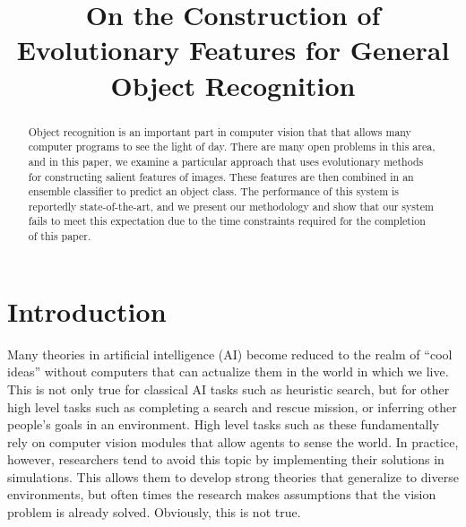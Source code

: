 \documentclass[conference]{IEEEtran}
\begin{document}
\author{
}

\title{On the Construction of Evolutionary Features for General Object Recognition}
\maketitle

\begin{abstract}
  Object recognition is an important part in computer vision that that allows many computer programs to see the light of day. There are many open problems in this area, and in this paper, we examine a particular approach that uses evolutionary methods for constructing salient features of images. These features are then combined in an ensemble classifier to predict an object class. The performance of this system is reportedly state-of-the-art, and we present our methodology and show that our system fails to meet this expectation due to the time constraints required for the completion of this paper.
\end{abstract}

\IEEEpeerreviewmaketitle

\section{Introduction}
Many theories in artificial intelligence (AI) become reduced to the realm of ``cool ideas'' without computers that can actualize them in the world in which we live. This is not only true for classical AI tasks such as heuristic search, but for other high level tasks such as completing a search and rescue mission, or inferring other people's goals in an environment. High level tasks such as these fundamentally rely on computer vision modules that allow agents to sense the world. In practice, however, researchers tend to avoid this topic by implementing their solutions in simulations. This allows them to develop strong theories that generalize to diverse environments, but often times the research makes assumptions that the vision problem is already solved. Obviously, this is not true.
\end{document}
